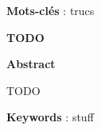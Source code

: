 \quad

\textbf{Mots-clés} : trucs

\begin{center}\textbf{\large TODO }

\quad

\textbf{Abstract}
\end{center}

TODO

\quad

\textbf{Keywords} : stuff




\cleardoublepage
\dominitoc
\makeatletter
\renewcommand{\tableofcontents}[1][\contentsname]{%
  \chapter*{#1}
}
\makeatother
\tableofcontents
